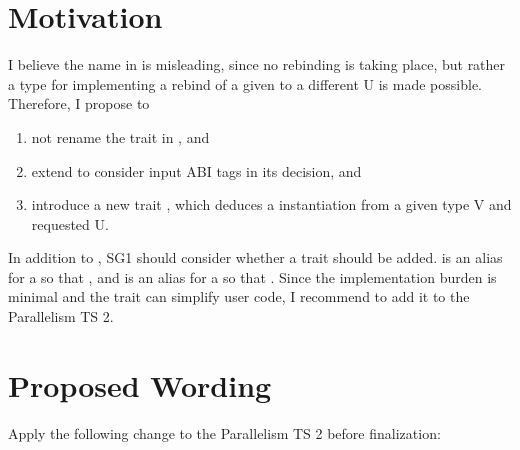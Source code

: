 \section{Motivation}
I believe the name  in \textcite{P0820R1} is misleading, since no rebinding is taking place, but rather a type for implementing a rebind of a given \simd[<T, Abi>] to a different  \type U is made possible.
Therefore, I propose to
\begin{enumerate}
  \item not rename the  trait in \textcite{P0214R8}, and
  \item extend  to consider input ABI tags in its decision, and
  \item introduce a new trait , which deduces a \simd[<U, Abi>] instantiation from a given \simd type \type V and requested  \type U.
\end{enumerate}

In addition to , SG1 should consider whether a  trait should be added.
 is an alias for a \simd[<T, Abi1>] so that , and
 is an alias for a \mask[<T, Abi1>] so that .
Since the implementation burden is minimal and the trait can simplify user code, I recommend to add it to the Parallelism TS 2.

\section{Proposed Wording}

Apply the following change to the Parallelism TS 2 before finalization:
\begin{wgText}[modify §8.2]
  \begingroup
    \ttfamily\smaller[1]
    \\
    \\
    \\
    \\
    \wgAdd{}\\
    \\
  \endgroup
\end{wgText}

